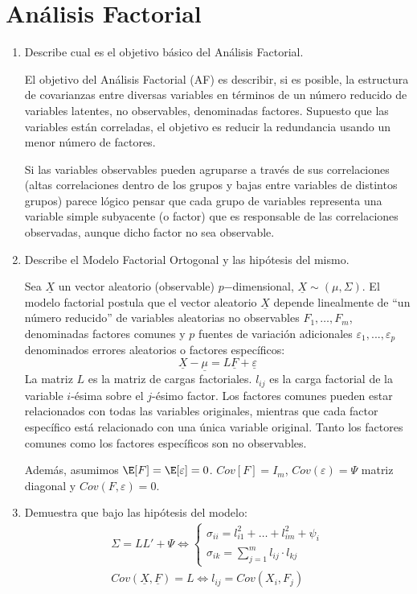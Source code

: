 \documentclass[twoside]{article}
\newcommand{\muestra}[1]{{\underline{#1}}}
\newcommand{\m}[1]{{\muestra{#1}}}
\newcommand{\mX}{{\muestra{X}}}
\begin{document}
\begin{enumerate}
\begin{enumerate}
\end{enumerate}
\end{enumerate}
\newpage
\section{Análisis Factorial}
\begin{enumerate}
\item Describe cual es el objetivo básico del Análisis Factorial.

El objetivo del Análisis Factorial (AF) es describir, si es posible, la estructura de covarianzas entre diversas variables en términos de un número reducido de variables latentes, no observables, denominadas factores. Supuesto que las variables están correladas, el objetivo es reducir la redundancia usando un menor número de factores. 

Si las variables observables pueden agruparse a través de sus correlaciones (altas correlaciones dentro de los grupos y
bajas entre variables de distintos grupos) parece lógico pensar que cada grupo de variables representa una variable simple subyacente (o factor) que es responsable de
las correlaciones observadas, aunque dicho factor no sea observable.

\item Describe el Modelo Factorial Ortogonal y las hipótesis del mismo.

Sea $\muestra{X}$ un vector aleatorio (observable) $p$−dimensional, $\mX \sim (\mu,\Sigma)$. El modelo factorial postula que el vector aleatorio $\muestra{X}$ depende linealmente de \enquote{un número reducido} de variables aleatorias no observables $F_1,\dotsc,F_m$, denominadas factores comunes y $p$ fuentes de variación adicionales $\varepsilon_1, ..., ε_p$ denominados errores aleatorios o
factores específicos:
$$
\mX-\m{\mu} = L\m{F}+\m{\varepsilon}
$$
La matriz $L$ es la matriz de cargas factoriales. $l_{ij}$ es la carga factorial de la variable $i$-ésima sobre el $j$-ésimo factor. Los factores comunes pueden estar relacionados con todas las variables originales, mientras que cada factor específico está relacionado con una única variable original. Tanto los factores comunes como los factores específicos son no observables. 

Además, asumimos $\E[F]=\E[\varepsilon]=0$. $Cov[F]=I_m$, $Cov(\varepsilon)=\Psi$ matriz diagonal y $Cov(F,\varepsilon)=0$.
\item Demuestra que bajo las hipótesis del modelo:
\begin{gather}
\Sigma = L L' + \Psi \Leftrightarrow
\begin{cases}
\sigma_{ii} = l_{i1}^2 + \dots + l_{im}^2 + \psi_i\\
\sigma_{ik} = \sum_{j=1}^m l_{ij} \cdot l_{kj}
\end{cases}\\
Cov(\m{X}, \m{F}) = L \Leftrightarrow l_{ij} = Cov(X_i, F_j)
\end{gather}


\end{enumerate}
\end{document}
